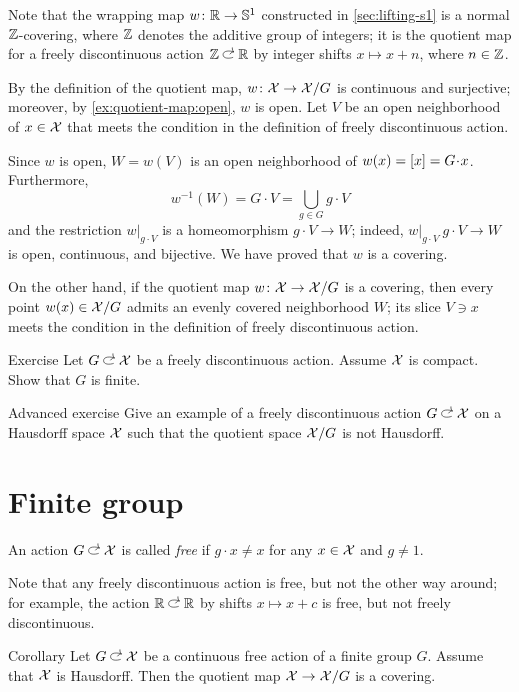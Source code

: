 {Note that the wrapping map $w\colon\mathbb{R}\to \mathbb{S}^1$ constructed in \ref{sec:lifting-s1} is a normal $\mathbb{Z}$-covering, where $\mathbb{Z}$ denotes the additive group of integers;
it is the quotient map for a freely discontinuous action $\ZZ\acts\RR$ by integer shifts $x\mapsto x+n$, where $n\in\mathbb{Z}$.

By the definition of the quotient map, $w\colon\mathcal{X}\to \mathcal{X}/G$ is continuous and surjective;
moreover, by \ref{ex:quotient-map:open}, $w$ is open.
Let $V$ be an open neighborhood of $x\in \mathcal{X}$ that meets the condition in the definition of freely discontinuous action.

Since $w$ is open, $W=w(V)$ is an open neighborhood of $w(x)\z=[x]=G\cdot x$.
Furthermore,
\[w^{-1}(W)=G\cdot V=\bigcup_{g\in G} g\cdot V\]
and the restriction $w|_{g\cdot V}$ is a homeomorphism $g\cdot V\to W$;
indeed, $w|_{g\cdot V}\:g\cdot V\to W$ is open, continuous, and bijective.
We have proved that $w$ is a covering.

On the other hand, if the quotient map $w\colon\mathcal{X}\to \mathcal{X}/G$ is a covering,
then every point $w(x)\in \mathcal{X}/G$ admits an evenly covered neighborhood $W$;
its slice $V\ni x$ meets the condition in the definition of freely discontinuous action.
\qeds

\begin{thm}{Exercise}\label{ex:freely-discontinuous+compact}
Let $G\acts \c{X}$ be a freely discontinuous action.
Assume $\mathcal{X}$ is compact.
Show that $G$ is finite.
\end{thm}


\begin{thm}{Advanced exercise}\label{ex:freely-discontinuous+hausdorff}
Give an example of a freely discontinuous action $G\acts \c{X}$ on a Hausdorff space $\mathcal{X}$ such that the quotient space $\mathcal{X}/G$ is not Hausdorff.
\end{thm}

\section{Finite group}

An action $G\acts \c{X}$ is called \emph{free} if $g\cdot x\ne x$ for any $x\in\mathcal{X}$ and $g\ne 1$.

Note that any freely discontinuous action is free, but not the other way around;
for example, the action $\RR\acts\RR$ by shifts $x\mapsto x+c$ is free, but not freely discontinuous.

\begin{thm}{Corollary}\label{cor:covering-finite-action}
Let $G\acts \c{X}$ be a continuous free action of a finite group $G$.
Assume that $\mathcal{X}$ is Hausdorff.
Then the quotient map $\c{X}\z\to \c{X}/G$ is a covering.
\end{thm}

}
